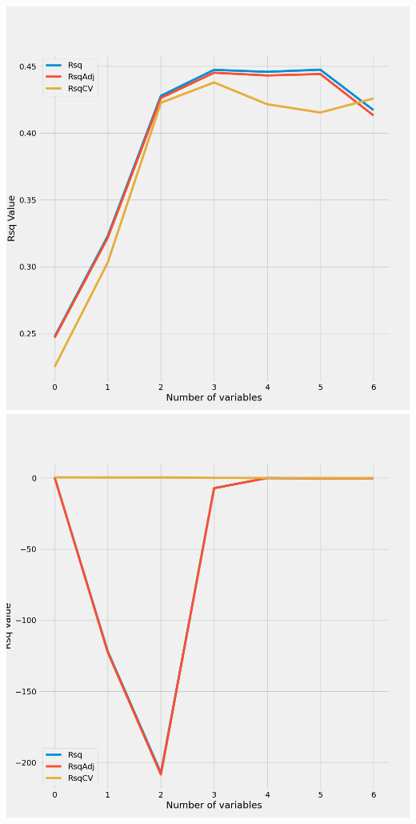 \documentclass{article}
\begin{document}
	\includegraphics[scale = 0.2]{../plots/python/ConcreteForward3L.png} 
	\includegraphics[scale = 0.2]{../plots/python/ConcreteBackward3L.png}
\end{document}
